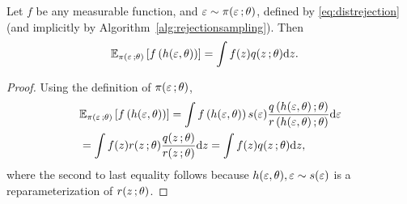 \begin{proposition}
\label{thm:reparam}
Let $f$ be any measurable function, and $\varepsilon \sim \pi(\varepsilon\, ;\theta)$, defined by \eqref{eq:distrejection} (and implicitly by Algorithm~\ref{alg:rejectionsampling}). Then
\begin{align*}
&\mathbb{E}_{\pi(\varepsilon\, ;\theta)}\left[f\left(h(\varepsilon,\theta)\right)\right] = \int f(z) q(z\, ; \theta) \textrm{d} z.
\end{align*}
\end{proposition}
\begin{proof}
Using the definition of $\pi(\varepsilon\, ;\theta)$,
\begin{align*}
&\mathbb{E}_{\pi(\varepsilon\, ;\theta)}\left[f\left(h(\varepsilon,\theta)\right)\right] 
=\int f\left(h(\varepsilon,\theta)\right) s(\varepsilon) \frac{q\left(h(\varepsilon,\theta)\, ; \theta\right)}{ r\left(h(\varepsilon,\theta)\, ; \theta\right)}  \textrm{d} \varepsilon \\
&= \int  f(z) r(z\, ; \theta) \frac{q(z\, ; \theta)}{r(z\, ; \theta)} \textrm{d} z = \int f(z) q(z\, ; \theta) \textrm{d} z,
\end{align*}
where the second to last equality follows because ${h(\varepsilon,\theta), \varepsilon \sim s(\varepsilon)}$ is a reparameterization of $r(z\, ; \theta)$.%
\end{proof}
